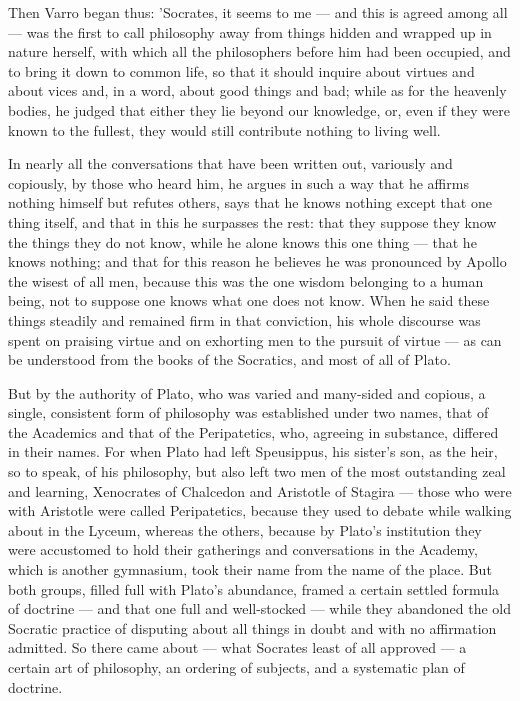  Then Varro began thus: 'Socrates, it seems to me — and this is agreed among all — was the first to call philosophy away from things hidden and wrapped up in nature herself, with which all the philosophers before him had been occupied, and to bring it down to common life, so that it should inquire about virtues and about vices and, in a word, about good things and bad; while as for the heavenly bodies, he judged that either they lie beyond our knowledge, or, even if they were known to the fullest, they would still contribute nothing to living well.

 In nearly all the conversations that have been written out, variously and copiously, by those who heard him, he argues in such a way that he affirms nothing himself but refutes others, says that he knows nothing except that one thing itself, and that in this he surpasses the rest: that they suppose they know the things they do not know, while he alone knows this one thing — that he knows nothing; and that for this reason he believes he was pronounced by Apollo the wisest of all men, because this was the one wisdom belonging to a human being, not to suppose one knows what one does not know. When he said these things steadily and remained firm in that conviction, his whole discourse was spent on praising virtue and on exhorting men to the pursuit of virtue — as can be understood from the books of the Socratics, and most of all of Plato.

 But by the authority of Plato, who was varied and many-sided and copious, a single, consistent form of philosophy was established under two names, that of the Academics and that of the Peripatetics, who, agreeing in substance, differed in their names. For when Plato had left Speusippus, his sister's son, as the heir, so to speak, of his philosophy, but also left two men of the most outstanding zeal and learning, Xenocrates of Chalcedon and Aristotle of Stagira — those who were with Aristotle were called Peripatetics, because they used to debate while walking about in the Lyceum, whereas the others, because by Plato's institution they were accustomed to hold their gatherings and conversations in the Academy, which is another gymnasium, took their name from the name of the place. But both groups, filled full with Plato's abundance, framed a certain settled formula of doctrine — and that one full and well-stocked — while they abandoned the old Socratic practice of disputing about all things in doubt and with no affirmation admitted. So there came about — what Socrates least of all approved — a certain art of philosophy, an ordering of subjects, and a systematic plan of doctrine.

